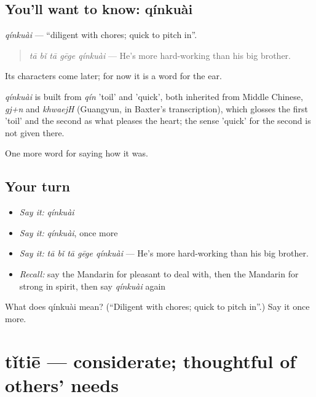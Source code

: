 \subsection*{You'll want to know: qínkuài}
\emph{qínkuài} — \textquotedblleft{}diligent with chores; quick to pitch in\textquotedblright{}.

\begin{quote}
\emph{tā bǐ tā gēge qínkuài} — He's more hard-working than his big brother.
\end{quote}

Its characters come later; for now it is a word for the ear.

\begin{cousinweb}
\emph{qínkuài} is built from \emph{qín} 'toil' and  'quick', both inherited from Middle Chinese, \emph{gj+n} and \emph{khwaejH} (Guangyun, in Baxter's transcription), which glosses the first 'toil' and the second as what pleases the heart; the sense 'quick' for the second is not given there.
\end{cousinweb}

\begin{grammarlens}[title={What you've built}]
One more word for saying how it was.
\end{grammarlens}

\subsection*{Your turn}
\begin{itemize}
\raggedright
  \item \emph{Say it:} \emph{qínkuài}
  \item \emph{Say it:} \emph{qínkuài}, once more
  \item \emph{Say it:} \emph{tā bǐ tā gēge qínkuài} — He's more hard-working than his big brother.
  \item \emph{Recall:} say the Mandarin for pleasant to deal with, then the Mandarin for strong in spirit, then say \emph{qínkuài} again
\end{itemize}

\begin{tcolorbox}[breakable,colback=teal!4,colframe=teal!35!black,title={Before you move on}]
What does qínkuài mean? (\textquotedblleft{}Diligent with chores; quick to pitch in\textquotedblright{}.) Say it once more.
\end{tcolorbox}
\section[tǐtiē]{tǐtiē — considerate; thoughtful of others' needs}

